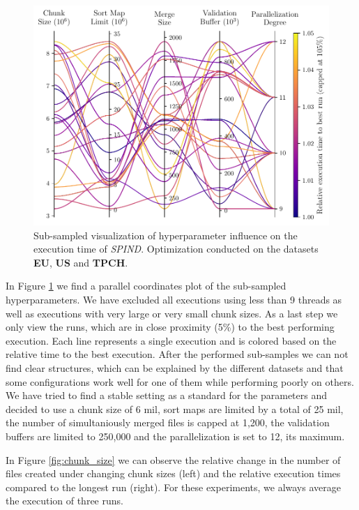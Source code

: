\begin{figure}[t]
    \centering
        \includegraphics[width=.48\textwidth]{figures/Hyperparameters.pdf}
    \caption{Sub-sampled visualization of hyperparameter influence on the execution time of \textit{SPIND}. Optimization conducted on the datasets \textbf{EU}, \textbf{US} and \textbf{TPCH}.}
    \label{fig:hyperparameters}
\end{figure}

In Figure \ref{fig:hyperparameters} we find a parallel coordinates plot of the sub-sampled hyperparameters. We have excluded all executions using less than 9 threads as well as executions with very large or very small chunk sizes. As a last step we only view the runs, which are in close proximity (5\%) to the best performing execution. Each line represents a single execution and is colored based on the relative time to the best execution. After the performed sub-samples we can not find clear structures, which can be explained by the different datasets and that some configurations work well for one of them while performing poorly on others. We have tried to find a stable setting as a standard for the parameters and decided to use a chunk size of 6 mil, sort maps are limited by a total of 25 mil, the number of simultaniously merged files is capped at 1,200, the validation buffers are limited to 250,000 and the parallelization is set to 12, its maximum.



In Figure \ref{fig:chunk_size} we can observe the relative change in the number of files created under changing chunk sizes (left) and the relative execution times compared to the longest run (right). For these experiments, we always average the execution of three runs.

